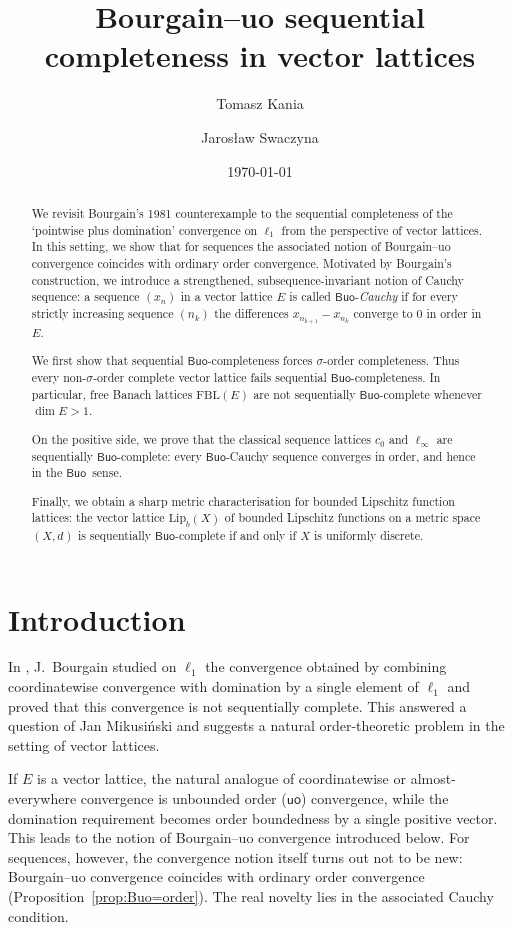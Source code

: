 \documentclass[11pt]{amsart}
\title[Bourgain-uo sequential completeness in vector lattices]{Bourgain--uo sequential completeness in vector lattices}
\author[T.~Kania]{Tomasz Kania}
\author[J.~Swaczyna]{Jaros{\l}aw Swaczyna}
\date{\today}
\theoremstyle{definition}
\newcommand{\uo}{\ensuremath{\mathsf{uo}}}
\newcommand{\Buo}{\ensuremath{\mathsf{Buo}}}
\begin{document}
\begin{abstract}
We revisit Bourgain's 1981 counterexample to the sequential completeness of the
`pointwise plus domination' convergence on $\ell_1$ from the perspective of
vector lattices. In this setting, we show that for sequences the associated
notion of Bourgain--uo convergence coincides with ordinary order convergence.
Motivated by Bourgain's construction, we introduce a strengthened,
subsequence-invariant notion of Cauchy sequence: a sequence $(x_n)$ in a vector
lattice $E$ is called \Buo-\emph{Cauchy} if for every strictly increasing
sequence $(n_k)$ the differences $x_{n_{k+1}}-x_{n_k}$ converge to $0$ in order
in $E$.

We first show that sequential \Buo-completeness forces $\sigma$-order
completeness. Thus every non-$\sigma$-order complete vector lattice fails
sequential \Buo-completeness. In particular, free Banach lattices
$\mathrm{FBL}(E)$ are not sequentially \Buo-complete whenever $\dim E>1$.

On the positive side, we prove that the classical sequence lattices $c_0$ and
$\ell_\infty$ are sequentially \Buo-complete: every \Buo-Cauchy sequence
converges in order, and hence in the \Buo\ sense.

Finally, we obtain a sharp metric characterisation for bounded Lipschitz
function lattices: the vector lattice $\mathrm{Lip}_b(X)$ of bounded Lipschitz
functions on a metric space $(X,d)$ is sequentially \Buo-complete if and only
if $X$ is uniformly discrete.
\end{abstract}



\maketitle
\section{Introduction}

In \cite{Bourgain81}, J.~Bourgain studied on $\ell_1$ the convergence obtained by
combining coordinatewise convergence with domination by a single element of
$\ell_1$ and proved that this convergence is not sequentially complete.  This
answered a question of Jan Mikusi\'{n}ski and suggests a natural order-theoretic
problem in the setting of vector lattices.

If $E$ is a vector lattice, the natural analogue of coordinatewise or
almost-everywhere convergence is unbounded order ($\uo$) convergence, while the
domination requirement becomes order boundedness by a single positive vector.
This leads to the notion of Bourgain--uo convergence introduced below.  For
sequences, however, the convergence notion itself turns out not to be new:
Bourgain--uo convergence coincides with ordinary order convergence
(Proposition~\ref{prop:Buo=order}).  The real novelty lies in the associated
Cauchy condition.
\end{document}
